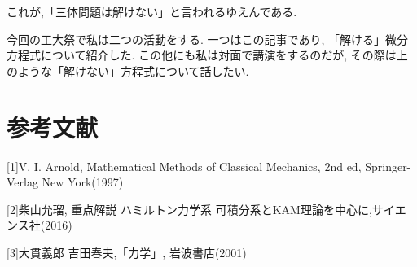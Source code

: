 \documentclass{ltjsarticle}
\theoremstyle{definition}
\numberwithin{thm}{section}
\theoremstyle{definition}
\numberwithin{prop}{section}
\theoremstyle{definition}
\numberwithin{dfn}{section}
\numberwithin{equation}{section}
\begin{document}
これが,「三体問題は解けない」と言われるゆえんである.

今回の工大祭で私は二つの活動をする. 一つはこの記事であり, 「解ける」微分方程式について紹介した. この他にも私は対面で講演をするのだが, その際は上のような「解けない」方程式について話したい.


\section{参考文献}
[1]V. I. Arnold, Mathematical Methods of Classical Mechanics, 2nd ed, Springer-Verlag New York(1997)

[2]柴山允瑠, 重点解説 ハミルトン力学系 可積分系とKAM理論を中心に,サイエンス社(2016)

[3]大貫義郎 吉田春夫,「力学」, 岩波書店(2001)
\end{document}
